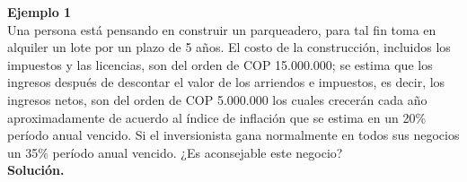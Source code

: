 \textbf{Ejemplo 1}\\

Una persona está pensando en construir un parqueadero, para tal fin toma en alquiler un lote por un plazo de 5 años. El costo de la construcción, incluidos los impuestos y las licencias, son del orden de  COP  15.000.000; se estima que los ingresos después de descontar el valor de los arriendos e impuestos, es decir, los ingresos netos, son del orden de  COP  5.000.000 los cuales crecerán cada año aproximadamente de acuerdo al índice de inflación que se estima en un 20\% período anual vencido. Si el inversionista gana normalmente en todos sus negocios un 35\% período anual vencido. ¿Es aconsejable este negocio?
\\

\textbf{Solución.}\\
